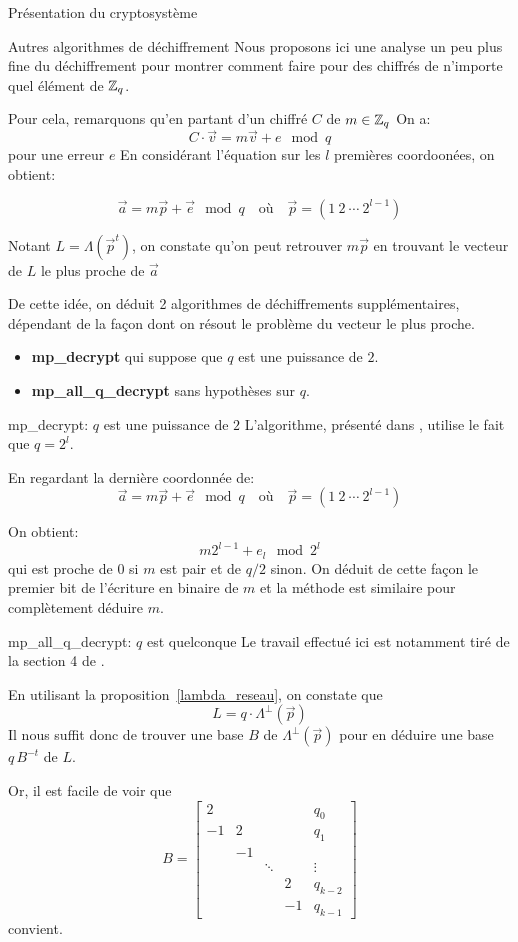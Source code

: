 \begin{section}{Présentation du cryptosystème}
\begin{subsection}{Autres algorithmes de déchiffrement}
Nous proposons ici une analyse un peu plus fine du déchiffrement pour
montrer comment faire pour des chiffrés de n'importe quel élément de $\mathbb{Z}_q$.

Pour cela, remarquons qu'en partant d'un chiffré  $C$
de $m \in \mathbb{Z}_q$
On a: 
\[ C \cdot \vec{v} = m \vec{v} + e \mod q \]
pour une erreur $e$
En considérant l'équation sur les $l$ premières coordoonées, on obtient:

	\[\vec{a} = m \vec{p} + \vec{e} \mod q\quad \text{où}\quad \vec{p} = (1\:2\:\cdots\:2^{l-1}) \]
 
Notant $L = \Lambda(\vec{p}^t)$, on constate qu'on peut 
retrouver $m\vec{p}$ en trouvant le vecteur de $L$
le plus proche de $\vec{a}$

De cette idée, on déduit 2 algorithmes de déchiffrements 
supplémentaires, dépendant de la façon dont 
on résout le problème du vecteur le plus proche.


\begin{itemize}
\item \textbf{mp\_decrypt} qui suppose que $q$ est 
	une puissance de $2$.
\item \textbf{mp\_all\_q\_decrypt} sans hypothèses sur $q$.
\end{itemize}

\begin{subsubsection}{mp\_decrypt: $q$ est une puissance de $2$}
L'algorithme, présenté dans  \cite{EPRINT:GenSahWat13}, utilise 
le fait que $q = 2^l$.

En regardant la dernière coordonnée de:
\[\vec{a} = m \vec{p} + \vec{e} \mod q\quad \text{où}\quad \vec{p} = (1\:2\:\cdots\:2^{l-1}) \]
 
On obtient:
\[m 2^{l-1} + e_{l} \mod 2^l \]
qui est proche de $0$ si $m$ est pair et de $q/2$ sinon. On déduit de cette 
façon le premier bit de l'écriture en binaire de $m$ et la méthode est similaire
pour complètement déduire $m$.
	
\end{subsubsection}
\begin{subsubsection}{mp\_all\_q\_decrypt: $q$ est quelconque}
Le travail effectué ici est notamment tiré de la section 4 de
\cite{EC:MicPei12}.

En utilisant la proposition~\ref{lambda_reseau}, on constate que
\[ L = q \cdot \Lambda^\bot\left(\vec{p}\right) \]
Il nous suffit donc de trouver une base $B$ de $\Lambda^\bot\left(\vec{p}\right)$
pour en déduire une base $q \, B^{-t}$ de $L$.

Or, il est facile de voir que  
\[ B = \begin{bmatrix} 
	2 & &&& q_0\\  
	-1 & 2 &&& q_1\\
   & -1 \\ 
	&    & \ddots & & \vdots \\
	&    &       &  2 & q_{k-2} \\
	&    &       &  -1 & q_{k-1}
\end{bmatrix}\]
convient.


\end{subsubsection}
\end{subsection}
\end{section}
